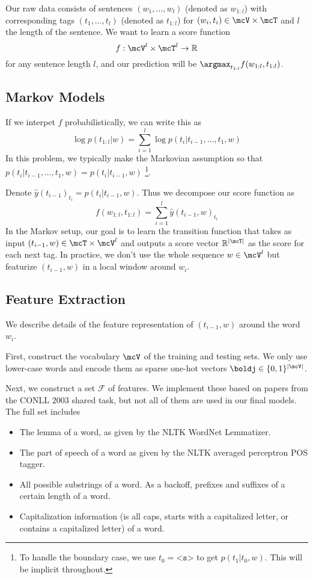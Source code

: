 \documentclass[11pt]{article}
\begin{document}
 Our raw data consists of sentences $(w_1, \ldots, w_l)$ (denoted as $w_{1:l}$) with corresponding tags $(t_1, \ldots, t_l)$ (denoted as $t_{1:l}$) for $(w_i, t_i) \in \mcV \times \mcT$ and $l$ the length of the sentence. We want to learn a score function
$$f : \mcV^l \times \mcT^l \to \mathbb{R}$$
for any sentence length $l$, and our prediction will be $\argmax_{t_{1:l}} f(w_{1:l}, t_{1:l})$.

\subsection{Markov Models}

If we interpet $f$ probabilistically, we can write this as
$$\log p(t_{1:l} | w) = \sum_{i=1}^l \log p(t_i | t_{i-1}, \ldots, t_1, w) $$
In this problem, we typically make the Markovian assumption so that $p(t_i | t_{i-1}, \ldots, t_1, w) = p(t_i | t_{i-1}, w)$ \footnote{To handle the boundary case, we use $t_0 = \texttt{<s>}$ to get $p(t_1 | t_0, w)$. This will be implicit throughout.}.

Denote $\widehat{y}(t_{i-1})_{t_i} = p(t_i | t_{i-1}, w)$. Thus we decompose our score function as
$$f(w_{1:l}, t_{1:l}) = \sum_{i=1}^l \widehat{y}(t_{i-1}, w)_{t_i}$$
In the Markov setup, our goal is to learn the transition function that takes as input $(t_{i-1}, w) \in \mcT \times \mcV^l$ and outputs a score vector $\mathbb{R}^{|\mcT|}$ as the score for each next tag. In practice, we don't use the whole sequence $w \in \mcV^l$ but featurize $(t_{i-1}, w)$ in a local window around $w_i$.

\subsection{Feature Extraction}

We describe details of the feature representation of $(t_{i-1}, w)$ around the word $w_i$.

First, construct the vocabulary $\mcV$ of the training and testing sets. We only use lower-case words and encode them as sparse one-hot vectors $\boldj \in \{0,1\}^{|\mcV|}$.


Next, we construct a set $\mathcal{F}$ of features. We implement these based on papers from the CONLL 2003 shared task, but not all of them are used in our final models. The full set includes
\begin{itemize}
  \item The lemma of a word, as given by the NLTK WordNet Lemmatizer. 
  \item The part of speech of a word as given by the NLTK averaged perceptron POS tagger. 
  \item All possible substrings of a word.
\subitem As a backoff, prefixes and suffixes of a certain length of a word.
  \item Capitalization information (is all caps, starts with a capitalized letter, or contains a capitalized letter) of a word.
\end{itemize}
\end{document}
